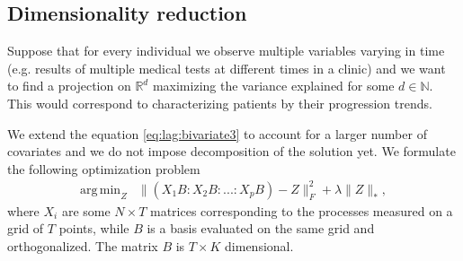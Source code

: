 \documentclass[preprint]{imsart}
\numberwithin{equation}{section}
\theoremstyle{plain}
\newcommand{\R}{\mathbb{R}}
\newcommand{\N}{\mathbb{N}}
\DeclareMathOperator*{\argmin}{arg\,min}
\begin{document}

\subsection{Dimensionality reduction}\label{ss:dim-red}

Suppose that for every individual we observe multiple variables varying in time (e.g. results of multiple medical tests at different times in a clinic) and we want to find a projection on $\R^d$ maximizing the variance explained for some $d \in \N$. This would correspond to characterizing patients by their progression trends.


We extend the equation \eqref{eq:lag:bivariate3} to account for a larger number of covariates and we do not impose decomposition of the solution yet. We formulate the following optimization problem
\begin{align*}\label{eq:multivar}
  \argmin_{Z} &\| (X_1B:X_2B:...:X_pB) - Z \|_F^2 + \lambda\|Z\|_*,
\end{align*}
where $X_i$ are some $N \times T$ matrices corresponding to the processes measured on a grid of $T$ points, while $B$ is a basis evaluated on the same grid and orthogonalized. The matrix $B$ is $T \times K$ dimensional.

\end{document}

